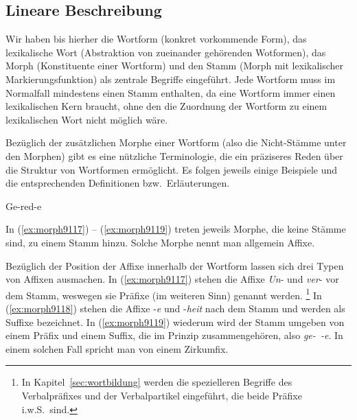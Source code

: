 \label{sec:morphstruktur}

\subsection{Lineare Beschreibung}

\label{sec:morphlinterm}

Wir haben bis hierher die Wortform (konkret vorkommende Form), das lexikalische Wort (Abstraktion von zueinander gehörenden Wotformen), das Morph (Konstituente einer Wortform) und den Stamm (Morph mit lexikalischer Markierungsfunktion) als zentrale Begriffe eingeführt.
Jede Wortform muss im Normalfall mindestens einen Stamm enthalten, da eine Wortform immer einen lexikalischen Kern braucht, ohne den die Zuordnung der Wortform zu einem lexikalischen Wort nicht möglich wäre.

Bezüglich der zusätzlichen Morphe einer Wortform (also die Nicht-Stämme unter den Morphen) gibt es eine nützliche Terminologie, die ein präziseres Reden über die Struktur von Wortformen ermöglicht.
Es folgen jeweils einige Beispiele und die entsprechenden Definitionen bzw.\ Erläuterungen.

\begin{exe}
  \ex\label{ex:morph9117}
  \begin{xlist}
  \end{xlist}
  \ex\label{ex:morph9118}
  \begin{xlist}
  \end{xlist}
  \ex\label{ex:morph9119}{Ge-red-e}
\end{exe}

In (\ref{ex:morph9117}) -- (\ref{ex:morph9119}) treten jeweils Morphe, die keine Stämme sind, zu einem Stamm hinzu.
Solche Morphe nennt man allgemein Affixe.



Bezüglich der Position der Affixe innerhalb der Wortform lassen sich drei Typen von Affixen ausmachen.
In (\ref{ex:morph9117}) stehen die Affixe \textit{Un}- und \textit{ver}- vor dem Stamm, weswegen sie Präfixe (im weiteren Sinn) genannt werden.%
\footnote{In Kapitel~\ref{sec:wortbildung} werden die spezielleren Begriffe des Verbalpräfixes und der Verbalpartikel eingeführt, die beide Präfixe i.w.S.\ sind.}
In (\ref{ex:morph9118}) stehen die Affixe -\textit{e} und -\textit{heit} nach dem Stamm und werden als Suffixe bezeichnet.
In (\ref{ex:morph9119}) wiederum wird der Stamm umgeben von einem Präfix und einem Suffix, die im Prinzip zusammengehören, also \textit{ge-~-e}.
In einem solchen Fall spricht man von einem Zirkumfix.

